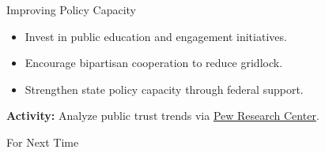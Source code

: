 \documentclass[12pt]{beamer}
\begin{document}
\begin{frame}{Improving Policy Capacity}
    \begin{itemize}
        \item Invest in public education and engagement initiatives.
        \item Encourage bipartisan cooperation to reduce gridlock.
        \item Strengthen state policy capacity through federal support.
    \end{itemize}
    \textbf{Activity:} Analyze public trust trends via \href{http://www.pewresearch.org}{Pew Research Center}.
\end{frame}

\begin{frame}{For Next Time}

\end{frame}
\end{document}
